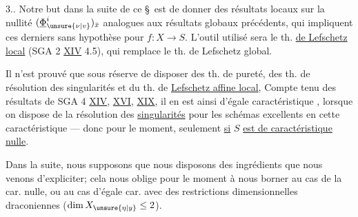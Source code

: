 3.. Notre but dans la suite de ce \S\ est de donner des résultats locaux sur la nullité  $(\underline\Phi^i_{\unsure{\nu|v}})_{\bar x}$ analogues aux résultats globaux précédents, qui impliquent ces derniers sans hypothèse  pour $f:X\to S$. L'outil utilisé sera le th. \uline{de Lefschetz local} (SGA 2 \uline{XIV} 4.5), qui remplace le th. de Lefschetz global.

Il n'est prouvé que sous réserve de disposer des th. de pureté,  des th. de résolution des singularités et du th. de \uline{Lefschetz affine local},  Compte tenu des résultats de SGA 4 \uline{XIV}, \uline{XVI}, \uline{XIX}, il en est ainsi    d'égale caractéristique , lorsque on dispose de la résolution des \uline{singularités} pour les schémas excellents en cette caractéristique ---  donc pour le moment, seulement \uline{si} $S$ \uline{est de caractéristique nulle}.

Dans la suite, nous supposons que nous disposons des ingrédients que nous venons d'expliciter; cela nous oblige pour le moment à nous borner au cas de la car. nulle, ou au cas d'égale car. avec des restrictions dimensionnelles draconiennes ($\dim X_{\unsure{\eta|y}}\leq2$).
